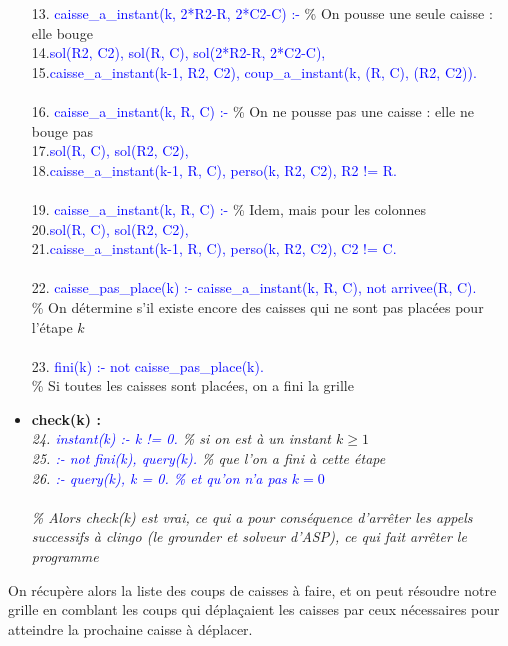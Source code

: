 \documentclass[12pt,a4paper]{article}
\begin{document}
\begin{itemize}
{		13. \textcolor{blue}{caisse\_a\_instant(k, 2*R2-R, 2*C2-C) :-} \% On pousse une seule caisse : elle bouge\\
		14.\qquad\qquad \textcolor{blue}{sol(R2, C2), sol(R, C), sol(2*R2-R, 2*C2-C),}\\
		15.\qquad\qquad \textcolor{blue}{caisse\_a\_instant(k-1, R2, C2), coup\_a\_instant(k, (R, C), (R2, C2)).}\\ \\
		16. \textcolor{blue}{caisse\_a\_instant(k, R, C) :-} \% On ne pousse pas une caisse : elle ne bouge pas\\
		17.\qquad\qquad \textcolor{blue}{sol(R, C), sol(R2, C2),}\\
		18.\qquad\qquad \textcolor{blue}{caisse\_a\_instant(k-1, R, C), perso(k, R2, C2), R2 != R.}\\ \\
		19. \textcolor{blue}{caisse\_a\_instant(k, R, C) :-} \% Idem, mais pour les colonnes\\
		20.\qquad\qquad \textcolor{blue}{sol(R, C), sol(R2, C2),}\\
		21.\qquad\qquad \textcolor{blue}{caisse\_a\_instant(k-1, R, C), perso(k, R2, C2), C2 != C.}\\ \\
		22. \textcolor{blue}{caisse\_pas\_place(k) :- caisse\_a\_instant(k, R, C), not arrivee(R, C).}\\
		\% On détermine s'il existe encore des caisses qui ne sont pas placées pour l'étape $k$\\ \\
		23. \textcolor{blue}{fini(k) :- not caisse\_pas\_place(k).}\\
		\% Si toutes les caisses sont placées, on a fini la grille\\
	}
	\item \textbf{check(k) :}\\
	\emph{
		24. \textcolor{blue}{instant(k) :- k != 0.} \% si on est à un instant $k\geq1$\\
		25. \textcolor{blue}{:- not fini(k), query(k).} \% que l'on a fini à cette étape\\
		26. \textcolor{blue}{:- query(k), k = 0. \% et qu'on n'a pas $k=0$}\\ \\
		\% Alors check(k) est vrai, ce qui a pour conséquence d'arrêter les appels successifs à clingo (le grounder et solveur d'ASP), ce qui fait arrêter le programme
	}
\end{itemize}
On récupère alors la liste des coups de caisses à faire, et on peut résoudre notre grille en comblant les coups qui déplaçaient les caisses par ceux nécessaires pour atteindre la prochaine caisse à déplacer.
\end{document}
